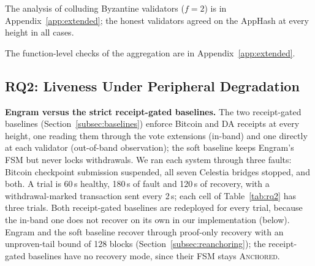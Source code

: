 The analysis of colluding Byzantine validators ($f{=}2$) is in Appendix~\ref{app:extended}; the honest validators agreed on the AppHash at every height in all cases.

The function-level checks of the aggregation are in Appendix~\ref{app:extended}.

\subsection{RQ2: Liveness Under Peripheral Degradation}
\label{subsec:rq2}

\textbf{Engram versus the strict receipt-gated baselines.} The two receipt-gated
baselines (Section~\ref{subsec:baselines}) enforce Bitcoin and DA receipts at
every height, one reading them through the vote extensions (in-band) and one
directly at each validator (out-of-band observation); the soft baseline keeps
Engram's FSM but never locks withdrawals. We ran each system through three faults: Bitcoin checkpoint submission suspended,
all seven Celestia bridges stopped, and both. A trial is 60\,s healthy, 180\,s
of fault and 120\,s of recovery, with a withdrawal-marked transaction sent every
2\,s; each cell of Table~\ref{tab:rq2} has three trials. Both
receipt-gated baselines are redeployed for every trial, because the in-band one
does not recover on its own in our implementation (below).
Engram and the soft baseline recover through proof-only recovery with an
unproven-tail bound of 128 blocks (Section~\ref{subsec:reanchoring}); the
receipt-gated baselines have no recovery mode, since their FSM stays \textsc{Anchored}.

\begin{table}[tbp]
\caption{Liveness and withdrawals under peripheral degradation (180\,s fault,
three runs per cell, mean and range). $n$ is the number of trials; Blocks is the count committed in the fault window, Max round the highest round at which a proposal was decided and Longest gap the longest interval between consecutive blocks in the window. Rate is the fault-window block rate as a
share of the same trial's healthy rate; ``No resume'' counts trials in which the
chain committed no block in the 120\,s after the fault ended. A gap entered as
$>$$x$ is a chain that never resumed: $x$ is the time from its last block to the end
of the trial, a lower bound of a gap that never closed. The in-band gate is the receipt-gated baseline whose receipts come
through the vote extensions, the out-of-band gate the
receipt-gated one in which each validator reads the layers itself;
Soft is Engram without the withdrawal lock. The last two columns count withdrawals committed
after and before the moment Engram's circuit breaker locks, 125\,s (checkpoint
pause), 40\,s (DA outage) and 40\,s (both) after the fault begins; the same
window is applied to every system. Engram and the soft baseline recover through
proof-only recovery with an unproven-tail bound of 128 blocks.}
\label{tab:rq2}
\centering
\footnotesize
\setlength{\tabcolsep}{3pt}
\resizebox{\linewidth}{!}{}
\end{table}

